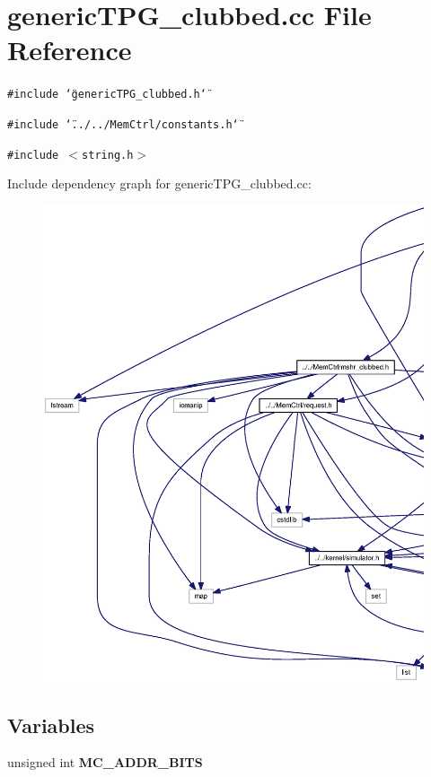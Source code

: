 \section{genericTPG\_\-clubbed.cc File Reference}
\label{genericTPG__clubbed_8cc}
{\tt \#include \char`\"{}genericTPG\_\-clubbed.h\char`\"{}}\par
{\tt \#include \char`\"{}../../MemCtrl/constants.h\char`\"{}}\par
{\tt \#include $<$string.h$>$}\par


Include dependency graph for genericTPG\_\-clubbed.cc:\nopagebreak
\begin{figure}[H]
\begin{center}
\leavevmode
\includegraphics[width=420pt]{genericTPG__clubbed_8cc__incl}
\end{center}
\end{figure}
\subsection*{Variables}
\begin{CompactItemize}
\item 
unsigned int {\bf MC\_\-ADDR\_\-BITS}
\end{CompactItemize}


